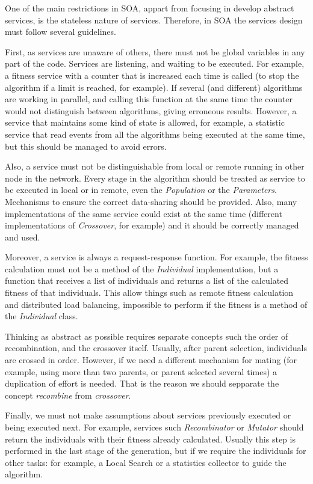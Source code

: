 One of the main restrictions in SOA, appart from focusing in develop abstract services, is the stateless nature of services. Therefore, in SOA the services design must follow several guidelines.

First, as services are unaware of others, there must not be global variables in any part of the code. Services are listening, and waiting to be executed. For example, a fitness service with a counter that is increased each time is called (to stop the algorithm if a limit is reached, for example). If several (and different) algorithms are working in parallel, and calling this function at the same time the counter would not distinguish between algorithms, giving erroneous results. However, a service that maintains some kind of state is allowed, for example, a statistic service that read events from all the algorithms being executed at the same time, but this should be managed to avoid errors.

Also, a service must not be distinguishable from local or remote running in other node in the network. Every stage in the algorithm should be treated as service to be executed in local or in remote, even the {\em Population} or the {\em Parameters}. Mechanisms to ensure the correct data-sharing should be provided. Also, many implementations of the same service could exist at the same time (different implementations of {\em Crossover}, for example) and it should be correctly managed and used.

Moreover, a service is always a request-response function. For example, the fitness calculation must not be a method of the {\em Individual} implementation, but a function that receives a list of individuals and returns a list of the calculated fitness of that individuals. This allow things such as remote fitness calculation and distributed load balancing, impossible to perform if the fitness is a method of the {\em Individual} class.

Thinking as abstract as possible requires separate concepts such the order of recombination, and the crossover itself. Usually, after parent selection, individuals are crossed in order. However, if we need a different mechanism for mating (for example, using more than two parents, or parent selected several times) a duplication of effort is needed. That is the reason we should sepparate the concept {\em recombine} from {\em crossover}. 

Finally, we must not make assumptions about services previously executed or being executed next. For example, services such {\em Recombinator} or {\em Mutator} should return the individuals with their fitness already calculated. Usually this step is performed in the last stage of the generation, but if we require the individuals for other tasks: for example, a Local Search or a statistics collector to guide the algorithm.

